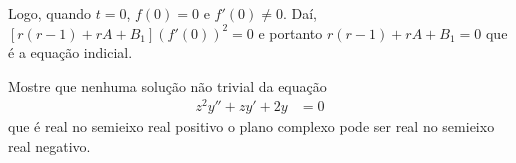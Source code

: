 \documentclass[a4paper,12pt, leqno, answers]{exam}
\begin{document}
\begin{questions}
\begin{solution}
        Logo, quando $t = 0$, $f(0) = 0$ e $f'(0) \neq 0$. Da\'{i}, $\left[ r \left( r - 1 \right) + r A + B_1 \right] \left( f'(0) \right)^2 = 0$ e portanto $r \left( r - 1 \right) + r A + B_1 = 0$ que \'{e} a equa\c{c}\~{a}o indicial.
    \end{solution}

    \question[T3 de 2011] Mostre que nenhuma solu\c{c}\~{a}o n\~{a}o trivial da equa\c{c}\~{a}o
    \begin{align*}
        z^2 y'' + z y' + 2 y &= 0
    \end{align*}
    que \'{e} real no semieixo real positivo o plano complexo pode ser real no semieixo real negativo.
    \begin{solution}
        
    \end{solution}
\end{questions}
\end{document}
